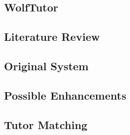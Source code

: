 \subsection{WolfTutor}
\label{sec:wolftutor}


\subsection{Literature Review}
\label{sec:literature-review}


\subsection{Original System}
\label{sec:original_system}


\subsection{Possible Enhancements}
 

\subsection{Tutor Matching}
\label{sec:tutor-matching}





